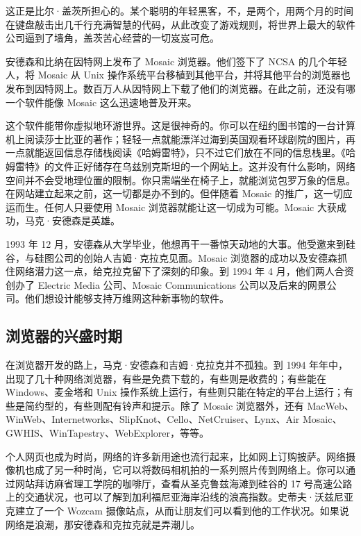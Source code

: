 \documentclass[12pt,UTF8]{ctexbook}
\begin{document}
这正是比尔·盖茨所担心的。某个聪明的年轻黑客，不，是两个，用两个月的时间在键盘敲击出几千行充满智慧的代码，从此改变了游戏规则，将世界上最大的软件公司逼到了墙角，盖茨苦心经营的一切岌岌可危。

安德森和比纳在因特网上发布了 Mosaic 浏览器。他们签下了 NCSA 的几个年轻人，将 Mosaic 从 Unix 操作系统平台移植到其他平台，并将其他平台的浏览器也发布到因特网上。数百万人从因特网上下载了他们的浏览器。在此之前，还没有哪一个软件能像 Mosaic 这么迅速地普及开来。

这个软件能带你虚拟地环游世界。这是很神奇的。你可以在纽约图书馆的一台计算机上阅读莎士比亚的著作；轻轻一点就能漂洋过海到英国观看环球剧院的图片，再一点就能返回信息存储栈阅读《哈姆雷特》，只不过它们放在不同的信息栈里。《哈姆雷特》的文件正好储存在乌兹别克斯坦的一个网站上。这并没有什么影响，网络空间并不会受地理位置的限制。你只需端坐在椅子上，就能浏览包罗万象的信息。在网站建立起来之前，这一切都是办不到的。但伴随着 Mosaic 的推广，这一切应运而生。任何人只要使用 Mosaic 浏览器就能让这一切成为可能。Mosaic 大获成功，马克·安德森是英雄。

1993 年 12 月，安德森从大学毕业，他想再干一番惊天动地的大事。他受邀来到硅谷，与硅图公司的创始人吉姆·克拉克见面。Mosaic 浏览器的成功以及安德森抓住网络潜力这一点，给克拉克留下了深刻的印象。到 1994 年 4 月，他们两人合资创办了 Electric Media 公司、Mosaic Communications 公司以及后来的网景公司。他们想设计能够支持万维网这种新事物的软件。





\subsection{浏览器的兴盛时期}


在浏览器开发的路上，马克·安德森和吉姆·克拉克并不孤独。到 1994 年年中，出现了几十种网络浏览器，有些是免费下载的，有些则是收费的；有些能在 Windows、麦金塔和 Unix 操作系统上运行，有些则只能在特定的平台上运行；有些是简约型的，有些则配有铃声和提示。除了 Mosaic 浏览器外，还有 MacWeb、WinWeb、Internetworks、SlipKnot、Cello、NetCruiser、Lynx、Air Mosaic、GWHIS、WinTapestry、WebExplorer，等等。

个人网页也成为时尚，网络的许多新用途也流行起来，比如网上订购披萨。网络摄像机也成了另一种时尚，它可以将数码相机拍的一系列照片传到网络上。你可以通过网站拜访麻省理工学院的咖啡厅，查看从圣克鲁兹海滩到硅谷的 17 号高速公路上的交通状况，也可以了解到加利福尼亚海岸沿线的浪高指数。史蒂夫·沃兹尼亚克建立了一个 Wozcam 摄像站点，从而让朋友们可以看到他的工作状况。如果说网络是浪潮，那安德森和克拉克就是弄潮儿。
\end{document}
